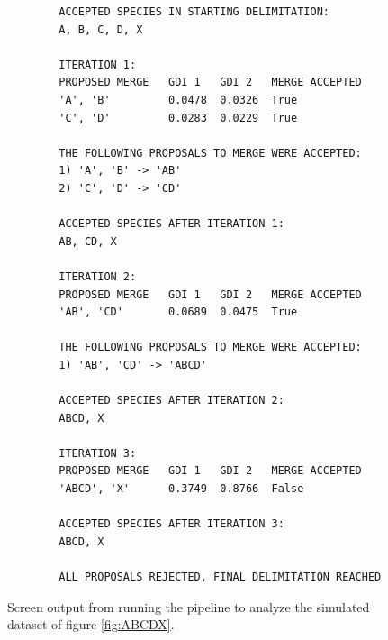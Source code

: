 \documentclass[A4]{article1}
\begin{document}
\begin{figure}
    \centering
    \footnotesize
    
    \begin{verbatim}
        ACCEPTED SPECIES IN STARTING DELIMITATION:
        A, B, C, D, X
        
        ITERATION 1:
        PROPOSED MERGE   GDI 1   GDI 2   MERGE ACCEPTED
        'A', 'B'         0.0478  0.0326  True
        'C', 'D'         0.0283  0.0229  True
        
        THE FOLLOWING PROPOSALS TO MERGE WERE ACCEPTED:
        1) 'A', 'B' -> 'AB'
        2) 'C', 'D' -> 'CD'
        
        ACCEPTED SPECIES AFTER ITERATION 1:
        AB, CD, X
        
        ITERATION 2:
        PROPOSED MERGE   GDI 1   GDI 2   MERGE ACCEPTED
        'AB', 'CD'       0.0689  0.0475  True 
        
        THE FOLLOWING PROPOSALS TO MERGE WERE ACCEPTED:
        1) 'AB', 'CD' -> 'ABCD'
        
        ACCEPTED SPECIES AFTER ITERATION 2:
        ABCD, X
        
        ITERATION 3:
        PROPOSED MERGE   GDI 1   GDI 2   MERGE ACCEPTED
        'ABCD', 'X'      0.3749  0.8766  False
        
        ACCEPTED SPECIES AFTER ITERATION 3:
        ABCD, X
        
        ALL PROPOSALS REJECTED, FINAL DELIMITATION REACHED
    \end{verbatim}
    
    \caption{Screen output from running the pipeline to analyze the simulated dataset of
        figure \ref{fig:ABCDX}. %
    } \label{fig:ABCDX-output}
\end{figure}



\FloatBarrier
\end{document}

